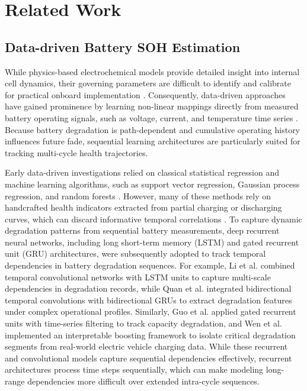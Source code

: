 \documentclass[a4paper,fleqn]{cas-sc}
\begin{document}
\section{Related Work}\label{sec:related}

\subsection{Data-driven Battery SOH Estimation}\label{sec:rw-data}
While physics-based electrochemical models provide detailed insight into internal cell dynamics, their governing parameters are difficult to identify and calibrate for practical onboard implementation \citep{asiri2025}. Consequently, data-driven approaches have gained prominence by learning non-linear mappings directly from measured battery operating signals, such as voltage, current, and temperature time series \citep{zhao2025capacity,wang2026lithium}. Because battery degradation is path-dependent and cumulative operating history influences future fade, sequential learning architectures are particularly suited for tracking multi-cycle health trajectories.

Early data-driven investigations relied on classical statistical regression and machine learning algorithms, such as support vector regression, Gaussian process regression, and random forests \citep{zhao2022lithium}. However, many of these methods rely on handcrafted health indicators extracted from partial charging or discharging curves, which can discard informative temporal correlations \citep{wang2024state}. To capture dynamic degradation patterns from sequential battery measurements, deep recurrent neural networks, including long short-term memory (LSTM) and gated recurrent unit (GRU) architectures, were subsequently adopted to track temporal dependencies in battery degradation sequences. For example, Li et al. \citep{li2023} combined temporal convolutional networks with LSTM units to capture multi-scale dependencies in degradation records, while Quan et al. \citep{qhdbo2025} integrated bidirectional temporal convolutions with bidirectional GRUs to extract degradation features under complex operational profiles. Similarly, Guo et al. \citep{guo2023} applied gated recurrent units with time-series filtering to track capacity degradation, and Wen et al. \citep{wen2024lithium} implemented an interpretable boosting framework to isolate critical degradation segments from real-world electric vehicle charging data. While these recurrent and convolutional models capture sequential dependencies effectively, recurrent architectures process time steps sequentially, which can make modeling long-range dependencies more difficult over extended intra-cycle sequences.
\end{document}

